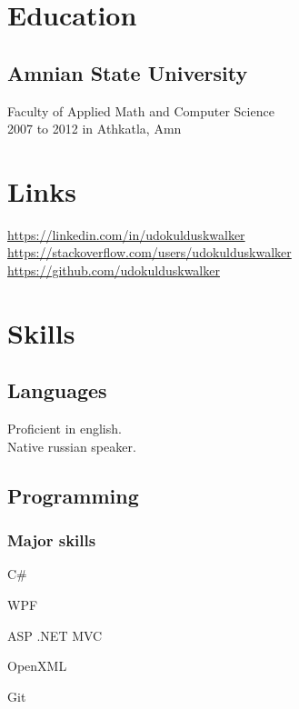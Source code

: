 \documentclass[a4paper,11pt]{article}
\newcommand{\periodinminsk}[1]{{\footnotesize #1 in Athkatla, Amn}}
\begin{document}
  \vspace{0.5cm}
  \begin{minipage}[t]{0.34\textwidth}
    \section*{Education} 
    \subsection*{Amnian State University}
    Faculty of Applied Math and Computer Science\\
    \periodinminsk{2007 to 2012}
    \section*{Links} 
    \href{https://linkedin.com/in/udokulduskwalker}{https://linkedin.com/in/\allowbreak udokulduskwalker}\\
    \href{https://stackoverflow.com/users/udokulduskwalker}{https://stackoverflow.com/\allowbreak users/udokulduskwalker}\\
    \href{https://github.com/udokulduskwalker}{https://github.com/\allowbreak udokulduskwalker}
    \section*{Skills}
    \subsection*{Languages}
    Proficient in english.\\
    Native russian speaker.
    \subsection*{Programming}
    \subsubsection*{Major skills}
    \begin{inparaitem}
      \item C\# 
      \item WPF
      \item ASP .NET MVC
      \item OpenXML
      \item Git
    \end{inparaitem}

\end{minipage}
\end{document}
